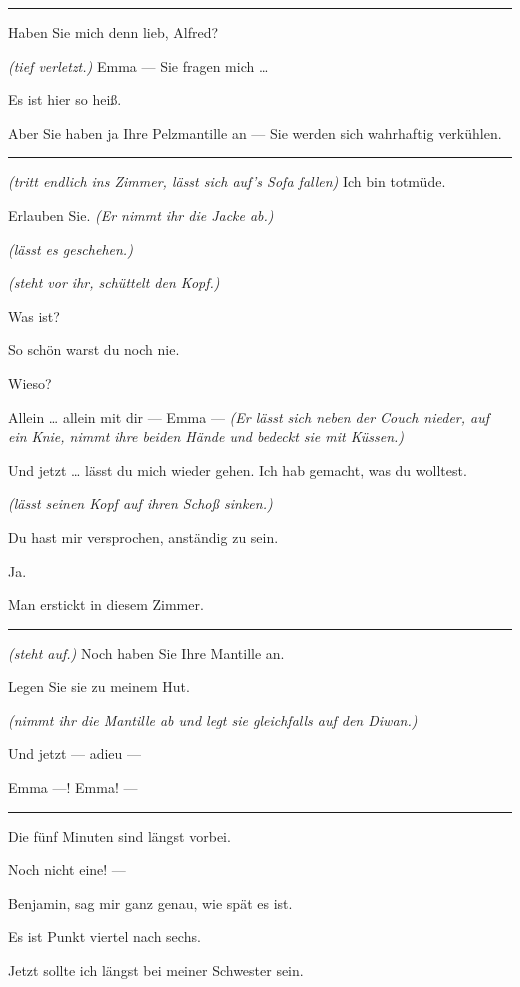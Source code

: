 \documentclass[
	final,
	a4paper,
	ngerman,
	mpinclude = true, %
	twoside = true,
	open = right,
	cleardoublepage = plain,
	DIV = 13,
	BCOR = 1cm,
	titlepage = firstiscover,
	]{scrbook}
\newcommand{\direction}[1]{\textit{(#1)}}
\newenvironment{deletion}{%
		\vspace{0.25\baselineskip}
		\hrule
		\vspace{0.25\baselineskip}
		\color{darkgray}
	}{
		\color{black}
		\vspace{0.25\baselineskip}
		\hrule 
		\vspace{0.25\baselineskip}
	}
\newcommand{\thecharacter}[1]{\textup{\textsc{#1}}\xspace}
\newcommand{\theherr}{\thecharacter{Benjamin}}
\newcommand{\thefrau}{\thecharacter{Emma}}
\newcommand{\character}[1]{\item[#1:]}
\newcommand{\herr}{\character{\theherr}}
\newcommand{\frau}{\character{\thefrau}}
\begin{document}
\begin{play}
\begin{deletion}
	\frau
	Haben Sie mich denn lieb, Alfred?

	\herr
	\direction{tief verletzt.} Emma --- Sie fragen mich \ldots{}

	\frau
	Es ist hier so heiß.

	\herr
	Aber Sie haben ja Ihre Pelzmantille an --- Sie werden sich wahrhaftig verkühlen.
	\end{deletion}

	\frau
	\direction{tritt endlich ins Zimmer, lässt sich auf's Sofa fallen} Ich bin totmüde.

	\herr
	Erlauben Sie. \direction{Er nimmt ihr die Jacke ab.}

	\frau
	\direction{lässt es geschehen.}

	\herr
	\direction{steht vor ihr, schüttelt den Kopf.}

	\frau
	Was ist?

	\herr
	So schön warst du noch nie.

	\frau
	Wieso?

	\herr
	Allein \ldots{} allein mit dir --- Emma --- \direction{Er lässt sich neben der Couch nieder, auf ein Knie, nimmt ihre beiden Hände und bedeckt sie mit Küssen.}

	\frau
	Und jetzt \ldots{} lässt du mich wieder gehen. Ich hab gemacht, was du wolltest.

	\herr
	\direction{lässt seinen Kopf auf ihren Schoß sinken.}

	\frau
	Du hast mir versprochen, anständig zu sein.

	\herr
	Ja.

	\frau
	Man erstickt in diesem Zimmer.
	\begin{deletion}
	\herr
	\direction{steht auf.} Noch haben Sie Ihre Mantille an.

	\frau
	Legen Sie sie zu meinem Hut.

	\herr
	\direction{nimmt ihr die Mantille ab und legt sie gleichfalls auf den Diwan.}

	\frau
	Und jetzt --- adieu ---

	\herr
	Emma ---! Emma! ---

	\frau
	\end{deletion}
	Die fünf Minuten sind längst vorbei.

	\herr
	Noch nicht eine! ---

	\frau
	Benjamin, sag mir ganz genau, wie spät es ist.

	\herr
	Es ist Punkt viertel nach sechs.

	\frau
	Jetzt sollte ich längst bei meiner Schwester sein.


\end{play}
\end{document}
